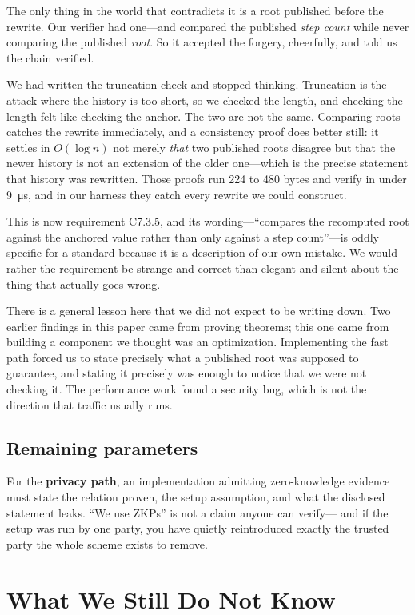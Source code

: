 \documentclass[11pt]{article}
\begin{document}
The only thing in the world that contradicts it is a root published before the
rewrite. Our verifier had one---and compared the published \emph{step count}
while never comparing the published \emph{root}. So it accepted the forgery,
cheerfully, and told us the chain verified.

We had written the truncation check and stopped thinking. Truncation is the
attack where the history is too short, so we checked the length, and checking
the length felt like checking the anchor. The two are not the same.
Comparing roots catches the rewrite immediately, and a consistency proof does better still: it settles
in $O(\log n)$ not merely \emph{that} two published roots disagree but that the
newer history is not an extension of the older one---which is the precise
statement that history was rewritten. Those proofs run 224 to 480 bytes and
verify in under \SI{9}{\micro\second}, and in our harness they catch every
rewrite we could construct.

This is now requirement C7.3.5, and its wording---``compares the recomputed
root against the anchored value rather than only against a step count''---is
oddly specific for a standard because it is a description of our own mistake.
We would rather the requirement be strange and correct than elegant and
silent about the thing that actually goes wrong.

There is a general lesson here that we did not expect to be writing down. Two
earlier findings in this paper came from proving theorems; this one came from
building a component we thought was an optimization. Implementing the fast path
forced us to state precisely what a published root was supposed to guarantee,
and stating it precisely was enough to notice that we were not checking it. The
performance work found a security bug, which is not the direction that traffic
usually runs.

\subsection{Remaining parameters}
For the \textbf{privacy path}, an implementation admitting zero-knowledge
evidence must state the relation proven, the setup assumption, and what the
disclosed statement leaks. ``We use ZKPs'' is not a claim anyone can verify---%
and if the setup was run by one party, you have quietly reintroduced exactly
the trusted party the whole scheme exists to remove.

\section{What We Still Do Not Know}
\label{sec:discussion}
\end{document}
